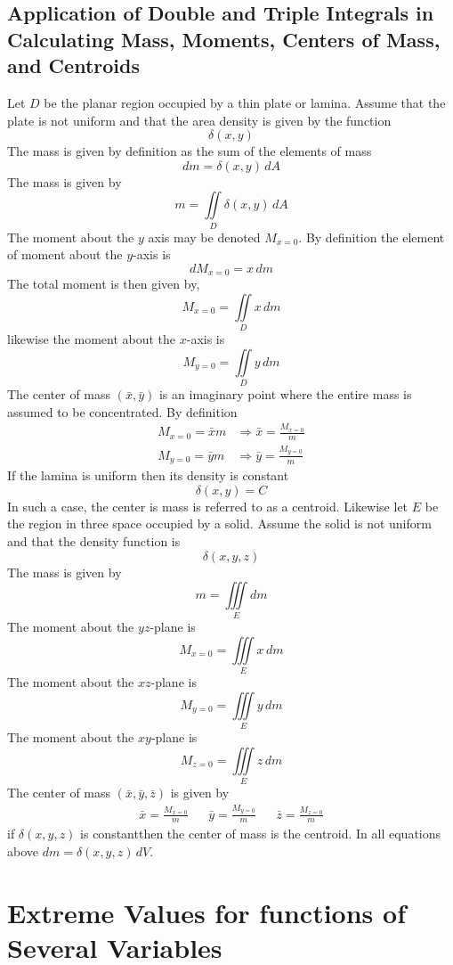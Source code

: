 \documentclass[14pt]{article}
\begin{document}
    \subsection{Application of Double and Triple Integrals in Calculating Mass, Moments, Centers of Mass, and Centroids}
    Let $D$ be the planar region occupied by a thin plate or lamina.
    Assume that the plate is not uniform and that the area density is
    given by the function
    $$\delta(x,y)$$ The mass is given by definition as the sum of the
    elements of mass
    $$dm=\delta(x,y)\, dA$$ The mass is given by 
    $$m=\iint\limits_D\delta(x,y)\, dA$$ The moment about the $y$ axis
    may be denoted $M_{x=0}$. By definition the element of moment about
    the $y$-axis is
    $$dM_{x=0}=x\, dm$$ The total moment is then given by,
    $$M_{x=0}=\iint\limits_D x\, dm$$ likewise the moment about the
    $x$-axis is 
    $$M_{y=0}=\iint\limits_D y\, dm$$ The center of mass $(\bar x, \bar
    y)$ is an imaginary point where the entire mass is assumed to be
    concentrated. By definition
    \begin{align*}
        M_{x=0}=\bar x m&\Rightarrow\bar x=\frac{M_{x=0}}{m}\\
        M_{y=0}=\bar y m&\Rightarrow\bar y=\frac{M_{y=0}}{m}
    \end{align*} 
    If the lamina is uniform then its density is
    constant\footnotemark[2]
    $$\delta(x,y)=C$$ In such a case, the center is mass is referred to
    as a centroid. Likewise let $E$ be the region in three space
    occupied by a solid. Assume the solid is not uniform and that the
    density function is
    $$\delta(x,y,z)$$ The mass is given by
    $$m=\iiint\limits_E dm$$ The moment about the $yz$-plane is
    $$M_{x=0}=\iiint\limits_E x\, dm$$ The moment about the $xz$-plane
    is
    $$M_{y=0}=\iiint\limits_E y\, dm$$ The moment about the $xy$-plane
    is
    $$M_{z=0}=\iiint\limits_E z\, dm$$ The center of mass $(\bar x, \bar
    y, \bar z)$ is given by
    \begin{align*}
        \bar x=\frac{M_{x=0}}{m}&&\bar y=\frac{M_{y=0}}{m}&&\bar z=\frac{M_{z=0}}{m}
    \end{align*}
    if $\delta(x,y,z)$ is constant\footnotemark[2] then the center of
    mass is the centroid. In all equations above $dm=\delta(x,y,z)\,
    dV$. 
    \section{Extreme Values for functions of Several Variables}
\end{document}
